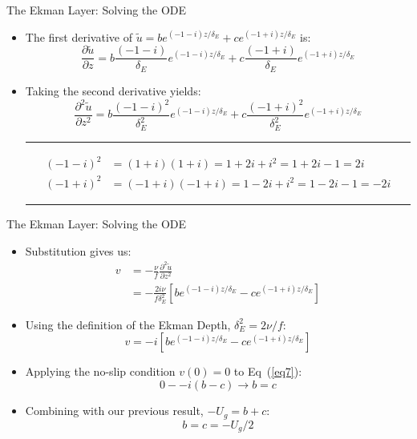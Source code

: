 \begin{frame}{The Ekman Layer: Solving the ODE}

\begin{itemize}
	\item The first derivative of $\tilde u = be^{(-1-i)z/\delta_E} + ce^{(-1+i)z/\delta_E}$ is:
	$$\frac{\partial \tilde u}{\partial z} = b \frac{(-1-i)}{\delta_E} e^{(-1-i)z/\delta_E} + c\frac{(-1+i)}{\delta_E}e^{(-1+i)z/\delta_E}$$
	\item Taking the second derivative yields:
	$$\frac{\partial^2 \tilde u}{\partial z^2} = b \frac{(-1-i)^2}{\delta_E^2} e^{(-1-i)z/\delta_E} + c\frac{(-1+i)^2}{\delta_E^2}e^{(-1+i)z/\delta_E}$$
	\hrule
	\begin{align*}
	(-1-i)^2 &= (1+i)(1+i) = 1 + 2i + i^2 = 1 + 2i -1 = 2i\\
	(-1+i)^2 &= (-1+i)(-1+i) = 1 - 2i + i^2 = 1 - 2i -1 = -2i
	\end{align*}
	\hrule
\end{itemize}
\end{frame}
\begin{frame}{The Ekman Layer: Solving the ODE}

\begin{itemize}
	\item Substitution gives us:
	\begin{align*}
	v&= -\frac{\nu}{f}\frac{\partial^2 \tilde u}{\partial z^2}\\
	&= -\frac{2i\nu}{f\delta_E^2}\left[	be^{(-1-i)z/\delta_E} - ce^{(-1+i)z/\delta_E}\right]
	\end{align*}
	\item Using the definition of the Ekman Depth, $\delta_E^2  = 2\nu/f$:
	\begin{equation}
		v = -i\left[be^{(-1-i)z/\delta_E} - ce^{(-1+i)z/\delta_E}\right]
		\label{eq7}
	\end{equation}
	\item Applying the no-slip condition $v(0) = 0$ to Eq~(\ref{eq7}):
	$$0 - -i(b-c) \rightarrow b = c$$
	\item Combining with our previous result, $-U_g = b+c$:
	$$b = c = -U_g/2$$
\end{itemize}
\end{frame}
